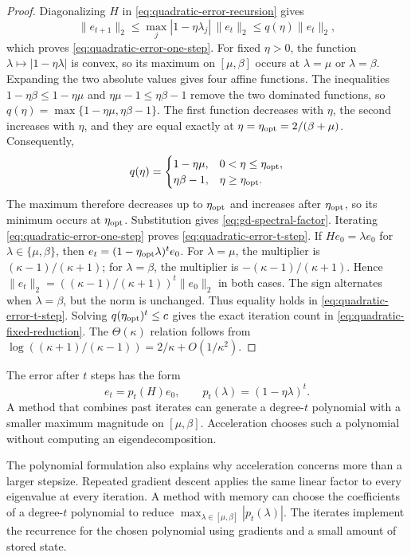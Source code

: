 \documentclass[11pt,twoside]{article}
\theoremstyle{definition}
\theoremstyle{remark}
\begin{document}
\begin{proof}
Diagonalizing $H$ in \cref{eq:quadratic-error-recursion} gives
\[
 \|e_{t+1}\|_2
 \le \max_j|1-\eta\lambda_j|\,\|e_t\|_2
 \le q(\eta)\|e_t\|_2,
\]
which proves \cref{eq:quadratic-error-one-step}. For fixed $\eta>0$, the
function $\lambda\mapsto |1-\eta\lambda|$ is convex, so its maximum on
$[\mu,\beta]$ occurs at $\lambda=\mu$ or $\lambda=\beta$. Expanding the two
absolute values gives four affine functions. The inequalities
$1-\eta\beta\le 1-\eta\mu$ and
$\eta\mu-1\le\eta\beta-1$ remove the two dominated functions, so
$q(\eta)=\max\{1-\eta\mu,\eta\beta-1\}$. The first function decreases with
$\eta$, the second increases with $\eta$, and they are equal exactly at
$\eta=\eta_{\rm opt}=2/(\beta+\mu)$. Consequently,
\[
 q(\eta)=
 \begin{cases}
  1-\eta\mu,&0<\eta\le\eta_{\rm opt},\\
  \eta\beta-1,&\eta\ge\eta_{\rm opt}.
 \end{cases}
\]
The maximum therefore decreases up to $\eta_{\rm opt}$ and increases after
$\eta_{\rm opt}$, so its minimum occurs at $\eta_{\rm opt}$. Substitution
gives \cref{eq:gd-spectral-factor}. Iterating
\cref{eq:quadratic-error-one-step} proves
\cref{eq:quadratic-error-t-step}. If $He_0=\lambda e_0$ for
$\lambda\in\{\mu,\beta\}$, then $e_t=(1-\eta_{\rm opt}\lambda)^t e_0$.
For $\lambda=\mu$, the multiplier is
$(\kappa-1)/(\kappa+1)$; for $\lambda=\beta$, the multiplier is
$-(\kappa-1)/(\kappa+1)$. Hence
$\|e_t\|_2=((\kappa-1)/(\kappa+1))^t\|e_0\|_2$ in both cases. The sign
alternates when $\lambda=\beta$, but the norm is unchanged. Thus equality
holds in
\cref{eq:quadratic-error-t-step}. Solving
$q(\eta_{\rm opt})^t\le c$ gives
the exact iteration count in \cref{eq:quadratic-fixed-reduction}. The
$\Theta(\kappa)$ relation follows from
$\log((\kappa+1)/(\kappa-1))=2/\kappa+O(1/\kappa^2)$.
\end{proof}

The error after $t$ steps has the form
\[
 e_t=p_t(H)e_0,
 \qquad p_t(\lambda)=(1-\eta\lambda)^t.
\]
A method that combines past iterates can generate a degree-$t$ polynomial
with a smaller maximum magnitude on $[\mu,\beta]$. Acceleration chooses such
a polynomial without computing an eigendecomposition.

The polynomial formulation also explains why acceleration concerns more than
a larger stepsize. Repeated gradient descent applies the same linear factor
to every eigenvalue at every iteration. A method with memory can choose the
coefficients of a degree-$t$ polynomial to reduce
$\max_{\lambda\in[\mu,\beta]}|p_t(\lambda)|$. The iterates implement the
recurrence for the chosen polynomial using gradients and a small amount of
stored state.
\end{document}

